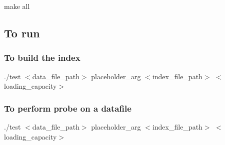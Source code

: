 make all \subsection*{To run}

\subsubsection*{To build the index}

./test {\ttfamily $<$data\+\_\+file\+\_\+path$>$} placeholder\+\_\+arg \textquotesingle{}$<$index\+\_\+file\+\_\+path$>$\textquotesingle{} \textquotesingle{}$<$loading\+\_\+capacity$>$\textquotesingle{} \subsubsection*{To perform probe on a datafile}

./test {\ttfamily $<$data\+\_\+file\+\_\+path$>$} placeholder\+\_\+arg \textquotesingle{}$<$index\+\_\+file\+\_\+path$>$\textquotesingle{} \textquotesingle{}$<$loading\+\_\+capacity$>$\textquotesingle{} 